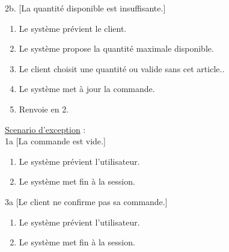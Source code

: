 		2b. [La quantité disponible est insuffisante.]
			\begin{enumerate}[label=2b.\arabic* ]
	       		\item Le système prévient le client.
				\item Le système propose la quantité maximale disponible.
				\item Le client choisit une quantité ou valide sans cet article..
				\item Le système met à jour la commande.
				\item Renvoie en 2.
			\end{enumerate} 
	\underline{Scenario d’exception} :\\
		1a [La commande est vide.]
			\begin{enumerate}[label=1a.\arabic* ]
				\item Le système prévient l'utilisateur.
				\item Le système met fin à la session.
			\end{enumerate}
		3a [Le client ne confirme pas sa commande.]
			\begin{enumerate}[label=3a.\arabic* ]
				\item Le système prévient l'utilisateur.
				\item Le système met fin à la session.
			\end{enumerate}